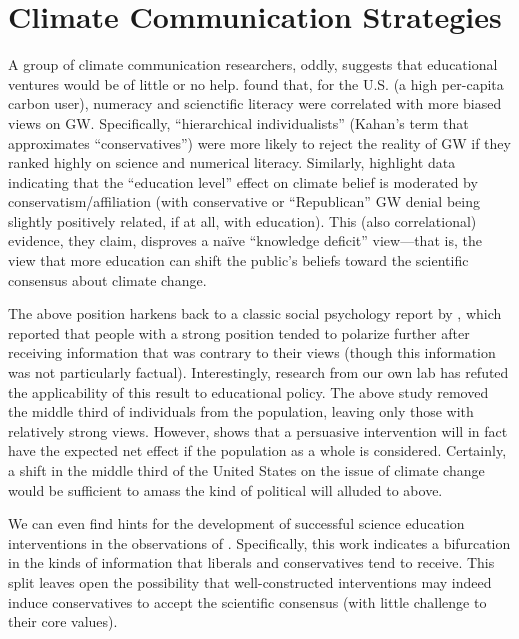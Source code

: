 
\section{Climate Communication Strategies}

A group of climate communication researchers, oddly, suggests that educational
ventures would be of little or no help. \textcite{kahan_polarizing_2012} found
that, for the U.S. (a high per-capita carbon user), numeracy and scienctific
literacy were correlated with more biased views on GW. Specifically,
“hierarchical individualists” (Kahan's term that approximates “conservatives”)
were more likely to reject the reality of GW if they ranked highly on science
and numerical literacy. Similarly, \textcite{mccright_politicization_2011}
highlight data indicating that the ``education level'' effect on climate belief
is moderated by conservatism/affiliation (with conservative or ``Republican'' GW
denial being slightly positively related, if at all, with education). This (also
correlational) evidence, they claim, disproves a naïve ``knowledge deficit''
view---that is, the view that more education can shift the public's beliefs
toward the scientific consensus about climate change. 

The above position harkens back to a classic social psychology report by
\textcite{lord_biased_1979}, which reported that people with a strong position
tended to polarize further after receiving information that was contrary to
their views (though this information was  not particularly factual).
Interestingly, research from our own lab has refuted the applicability of this
result to educational policy. The above study removed the middle third of
individuals from the population, leaving only those with relatively strong
views. However, \textcite{nelson_criminal_2007} shows that a persuasive
intervention will in fact have the expected net effect if the population as a
whole is considered. Certainly, a shift in the middle third of the United States
on the issue of climate change would be sufficient to amass the kind of
political will alluded to above.

We can even find hints for the development of successful science education
interventions in the observations of \textcite{mccright_politicization_2011}.
Specifically, this work indicates a bifurcation in the kinds of information that
liberals and conservatives tend to receive.  This split leaves open the
possibility that well-constructed interventions may indeed induce conservatives
to accept the scientific consensus (with little challenge to their core values).  

